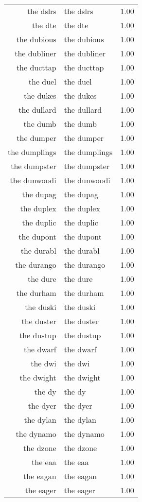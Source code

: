 \begin{table}[ht]
\begin{tabular}{rlr}
  the dslrs & the dslrs & 1.00 \\ 
  the dte & the dte & 1.00 \\ 
  the dubious & the dubious & 1.00 \\ 
  the dubliner & the dubliner & 1.00 \\ 
  the ducttap & the ducttap & 1.00 \\ 
  the duel & the duel & 1.00 \\ 
  the dukes & the dukes & 1.00 \\ 
  the dullard & the dullard & 1.00 \\ 
  the dumb & the dumb & 1.00 \\ 
  the dumper & the dumper & 1.00 \\ 
  the dumplings & the dumplings & 1.00 \\ 
  the dumpster & the dumpster & 1.00 \\ 
  the dunwoodi & the dunwoodi & 1.00 \\ 
  the dupag & the dupag & 1.00 \\ 
  the duplex & the duplex & 1.00 \\ 
  the duplic & the duplic & 1.00 \\ 
  the dupont & the dupont & 1.00 \\ 
  the durabl & the durabl & 1.00 \\ 
  the durango & the durango & 1.00 \\ 
  the dure & the dure & 1.00 \\ 
  the durham & the durham & 1.00 \\ 
  the duski & the duski & 1.00 \\ 
  the duster & the duster & 1.00 \\ 
  the dustup & the dustup & 1.00 \\ 
  the dwarf & the dwarf & 1.00 \\ 
  the dwi & the dwi & 1.00 \\ 
  the dwight & the dwight & 1.00 \\ 
  the dy & the dy & 1.00 \\ 
  the dyer & the dyer & 1.00 \\ 
  the dylan & the dylan & 1.00 \\ 
  the dynamo & the dynamo & 1.00 \\ 
  the dzone & the dzone & 1.00 \\ 
  the eaa & the eaa & 1.00 \\ 
  the eagan & the eagan & 1.00 \\ 
  the eager & the eager & 1.00 \\ 

\end{tabular}
\end{table}
